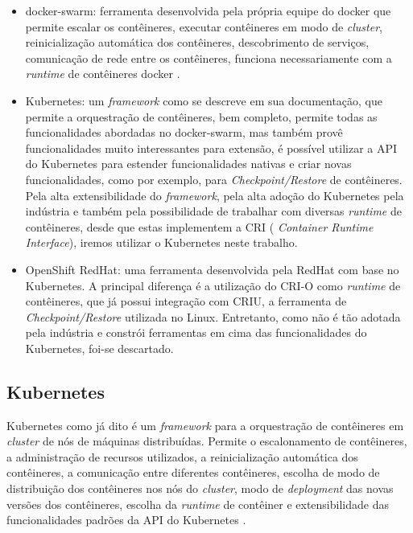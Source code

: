 \begin{itemize}
    \item docker-swarm: ferramenta desenvolvida pela própria equipe do docker que
    permite escalar os contêineres, executar contêineres em modo de \textit{cluster},
    reinicialização automática dos contêineres, descobrimento de serviços,
    comunicação de rede entre os contêineres, funciona necessariamente com a
    \textit{runtime} de contêineres docker \cite{docker-swarm}.
    \item Kubernetes: um \textit{framework} como se descreve em sua documentação,
    que permite a orquestração de contêineres, bem completo, permite todas as
    funcionalidades abordadas no docker-swarm, mas também provê funcionalidades
    muito interessantes para extensão, é possível utilizar a API do Kubernetes para
    estender funcionalidades nativas e criar novas funcionalidades, como por exemplo,
    para \textit{Checkpoint/Restore} de contêineres. Pela alta extensibilidade do
    \textit{framework}, pela alta adoção do Kubernetes pela indústria
    \cite{kubernetes:usage} e também pela possibilidade de trabalhar com diversas
    \textit{runtime} de contêineres, desde que estas implementem a CRI (
    \textit{Container Runtime Interface}), iremos utilizar o Kubernetes neste trabalho. 
    \item OpenShift RedHat: uma ferramenta desenvolvida pela RedHat com base no
    Kubernetes. A principal diferença é a utilização do CRI-O como \textit{runtime}
    de contêineres, que já possui integração com CRIU, a ferramenta de
    \textit{Checkpoint/Restore} utilizada no Linux. Entretanto, como não é tão
    adotada pela indústria e constrói ferramentas em cima das funcionalidades do
    Kubernetes, foi-se descartado. \cite{openshift}
\end{itemize}

\subsection{Kubernetes}

Kubernetes como já dito é um \textit{framework} para a orquestração de
contêineres em \textit{cluster} de nós de máquinas distribuídas. Permite
o escalonamento de contêineres, a administração de recursos utilizados,
a reinicialização automática dos contêineres, a comunicação entre diferentes
contêineres, escolha de modo de distribuição dos contêineres nos nós do
\textit{cluster}, modo de \textit{deployment} das novas versões dos contêineres,
escolha da \textit{runtime} de contêiner e extensibilidade das funcionalidades
padrões da API do Kubernetes \cite{kubernetes}.

